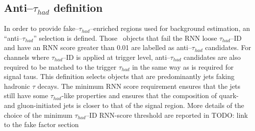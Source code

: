 \subsection{Anti--$\tau_{had}$ definition}
\label{sec:antitau-selection}
In order to provide fake--$\tau_{had}$--enriched regions used for background estimation, 
an ``anti--$\tau_{had}$'' selection is defined. 
Those \tauhadvis\ objects that fail the RNN loose $\tau_{had}$--ID 
and have an RNN score greater than 0.01 are labelled as anti--$\tau_{had}$ candidates. 
For channels where $\tau_{had}$--ID is applied at trigger level, anti--$\tau_{had}$
candidates are also required to be matched to the trigger $\tau_{had}$ in 
the same way as is required for signal taus.
This definition selects objects that are 
predominantly jets faking hadronic $\tau$ decays. 
The minimum RNN score requirement ensures that 
the jets still have some $\tau_{had}$-like properties 
and ensures that the composition of quark- and gluon-initiated jets 
is closer to that of the signal region.
More details of the choice of the minimum $\tau_{had}$--ID RNN-score
threshold are reported in TODO: link to the fake factor section

